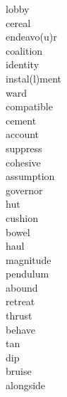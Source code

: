 \documentclass[a4paper, 11pt]{ctexart}
\begin{document}
\begin{multicols*}{3}
\begin{description}
\item[lobby]

\item[cereal]

\item[endeavo(u)r]

\item[coalition]

\item[identity]

\item[instal(l)ment]

\item[ward]

\item[compatible]

\item[cement]

\item[account]

\item[suppress]

\item[cohesive]

\item[assumption]

\item[governor]

\item[hut]

\item[cushion]

\item[bowel]

\item[haul]

\item[magnitude]

\item[pendulum]

\item[abound]

\item[retreat]

\item[thrust]

\item[behave]

\item[tan]

\item[dip]

\item[bruise]

\item[alongside]


\end{description}
\end{multicols*}
\end{document}
